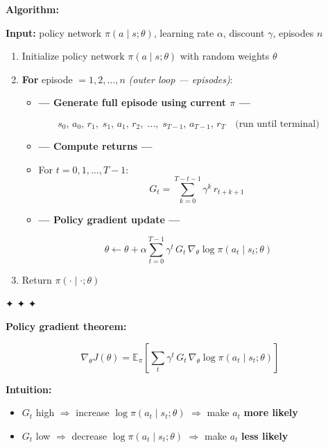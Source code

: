 \documentclass[11pt]{article}
\providecommand{\tightlist}{%
      \setlength{\itemsep}{0pt}\setlength{\parskip}{0pt}}
\begin{document}
    \textbf{Algorithm:}

\textbf{Input:} policy network \(\pi(a \mid s;\theta)\), learning rate
\(\alpha\), discount \(\gamma\), episodes \(n\)

\begin{enumerate}
\def\labelenumi{\arabic{enumi}.}
\item
  Initialize policy network \(\pi(a \mid s;\theta)\) with random weights
  \(\theta\)
\item
  \textbf{For} episode \(= 1, 2, \ldots, n\) \emph{(outer loop ---
  episodes)}:

  \begin{itemize}
  \tightlist
  \item
    \textbf{--- Generate full episode using current \(\pi\) ---}
  \end{itemize}

  \[s_0,\, a_0,\, r_1,\; s_1,\, a_1,\, r_2,\; \ldots,\; s_{T-1},\, a_{T-1},\, r_T \quad \text{(run until terminal)}\]

  \begin{itemize}
  \item
    \textbf{--- Compute returns ---}
  \item
    For \(t = 0, 1, \ldots, T-1\):
    \[G_t = \sum_{k=0}^{T-t-1} \gamma^k\, r_{t+k+1}\]
  \item
    \textbf{--- Policy gradient update ---}
  \end{itemize}

  \[\theta \leftarrow \theta + \alpha \sum_{t=0}^{T-1} \gamma^t\, G_t\, \nabla_\theta \log \pi(a_t \mid s_t;\theta)\]
\item
  Return \(\pi(\cdot \mid \cdot;\theta)\)
\end{enumerate}

✦ ✦ ✦

\textbf{Policy gradient theorem:}

\[\nabla_\theta J(\theta) = \mathbb{E}_\pi\!\left[\sum_t \gamma^t\, G_t\, \nabla_\theta \log \pi(a_t \mid s_t;\theta)\right]\]

\textbf{Intuition:}

\begin{itemize}
\tightlist
\item
  \(G_t\) high \(\Rightarrow\) increase \(\log\pi(a_t \mid s_t;\theta)\)
  \(\Rightarrow\) make \(a_t\) \textbf{more likely}
\item
  \(G_t\) low \(\Rightarrow\) decrease \(\log\pi(a_t \mid s_t;\theta)\)
  \(\Rightarrow\) make \(a_t\) \textbf{less likely}
\end{itemize}
\end{document}
